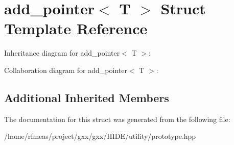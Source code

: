 \hypertarget{structadd__pointer}{}\section{add\+\_\+pointer$<$ T $>$ Struct Template Reference}
\label{structadd__pointer}


Inheritance diagram for add\+\_\+pointer$<$ T $>$\+:


Collaboration diagram for add\+\_\+pointer$<$ T $>$\+:
\subsection*{Additional Inherited Members}


The documentation for this struct was generated from the following file\+:\begin{DoxyCompactItemize}
\item 
/home/rfmeas/project/gxx/gxx/\+H\+I\+D\+E/utility/prototype.\+hpp\end{DoxyCompactItemize}
